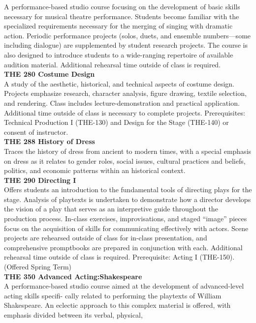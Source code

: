 \documentclass[
  letterpaper,
]{scrbook}
\begin{document}
A performance-based studio course focusing on the development of basic
skills necessary for musical theatre performance. Students become
familiar with the specialized requirements necessary for the merging of
singing with dramatic action. Periodic performance projects (solos,
duets, and ensemble numbers---some including dialogue) are supplemented
by student research projects. The course is also designed to introduce
students to a wide-ranging repertoire of available audition material.
Additional rehearsal time outside of class is required.\\
\textbf{THE 280 Costume Design}\\
A study of the aesthetic, historical, and technical aspects of costume
design. Projects emphasize research, character analysis, figure drawing,
textile selection, and rendering. Class includes lecture-demonstration
and practical application. Additional time outside of class is necessary
to complete projects. Prerequisites: Technical Production I (THE-130)
and Design for the Stage (THE-140) or consent of instructor.\\
\textbf{THE 288 History of Dress}\\
Traces the history of dress from ancient to modern times, with a special
emphasis on dress as it relates to gender roles, social issues, cultural
practices and beliefs, politics, and economic patterns within an
historical context.\\
\textbf{THE 290 Directing I}\\
Offers students an introduction to the fundamental tools of directing
plays for the stage. Analysis of playtexts is undertaken to demonstrate
how a director develops the vision of a play that serves as an
interpretive guide throughout the production process. In-class
exercises, improvisations, and staged ``image'' pieces focus on the
acquisition of skills for communicating effectively with actors. Scene
projects are rehearsed outside of class for in-class presentation, and
comprehensive promptbooks are prepared in conjunction with each.
Additional rehearsal time outside of class is required. Prerequisite:
Acting I (THE-150). (Offered Spring Term)\\
\textbf{THE 350 Advanced Acting:Shakespeare}\\
A performance-based studio course aimed at the development of
advanced-level acting skills specifi- cally related to performing the
playtexts of William Shakespeare. An eclectic approach to this complex
material is offered, with emphasis divided between its verbal, physical,
\end{document}

